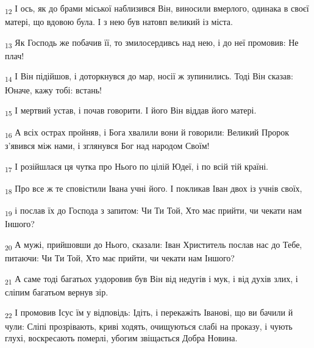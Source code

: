 \begin{tcolorbox}
\textsubscript{12} І ось, як до брами міської наблизився Він, виносили вмерлого, одинака в своєї матері, що вдовою була. І з нею був натовп великий із міста.
\end{tcolorbox}
\begin{tcolorbox}
\textsubscript{13} Як Господь же побачив її, то змилосердивсь над нею, і до неї промовив: Не плач!
\end{tcolorbox}
\begin{tcolorbox}
\textsubscript{14} І Він підійшов, і доторкнувся до мар, носії ж зупинились. Тоді Він сказав: Юначе, кажу тобі: встань!
\end{tcolorbox}
\begin{tcolorbox}
\textsubscript{15} І мертвий устав, і почав говорити. І його Він віддав його матері.
\end{tcolorbox}
\begin{tcolorbox}
\textsubscript{16} А всіх острах пройняв, і Бога хвалили вони й говорили: Великий Пророк з'явився між нами, і зглянувся Бог над народом Своїм!
\end{tcolorbox}
\begin{tcolorbox}
\textsubscript{17} І розійшлася ця чутка про Нього по цілій Юдеї, і по всій тій країні.
\end{tcolorbox}
\begin{tcolorbox}
\textsubscript{18} Про все ж те сповістили Івана учні його. І покликав Іван двох із учнів своїх,
\end{tcolorbox}
\begin{tcolorbox}
\textsubscript{19} і послав їх до Господа з запитом: Чи Ти Той, Хто має прийти, чи чекати нам Іншого?
\end{tcolorbox}
\begin{tcolorbox}
\textsubscript{20} А мужі, прийшовши до Нього, сказали: Іван Христитель послав нас до Тебе, питаючи: Чи Ти Той, Хто має прийти, чи чекати нам Іншого?
\end{tcolorbox}
\begin{tcolorbox}
\textsubscript{21} А саме тоді багатьох уздоровив був Він від недугів і мук, і від духів злих, і сліпим багатьом вернув зір.
\end{tcolorbox}
\begin{tcolorbox}
\textsubscript{22} І промовив Ісус їм у відповідь: Ідіть, і перекажіть Іванові, що ви бачили й чули: Сліпі прозрівають, криві ходять, очищуються слабі на проказу, і чують глухі, воскресають померлі, убогим звіщається Добра Новина.
\end{tcolorbox}
